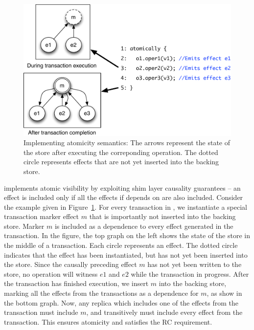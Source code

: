 \begin{figure}
\begin{center}
\includegraphics[width=\columnwidth]{Figures/AtomicityImpl}
\end{center}
\caption{Implementing atomicity semantics: The arrows represent the state of
the store after executing the correponding operation. The dotted circle
represents effects that are not yet inserted into the backing store.}
\label{fig:atomicity_impl}
\end{figure}

\name implements atomic visibility by exploiting shim layer causality guarantees
-- an effect is included only if all the effects if depends on are also
included. Consider the example given in Figure~\ref{fig:atomicity_impl}. For
every transaction in \name, we instantiate a special transaction marker effect
$m$ that is importantly not inserted into the backing store. Marker $m$ is
included as a dependence to every effect generated in the transaction. In the
figure, the top graph on the left shows the state of the store in the middle of
a transaction. Each circle represents an effect. The dotted circle indicates
that the effect has been instantiated, but has not yet been inserted into the
store. Since the causally preceding effect $m$ has not yet been written to the
store, no operation will witness $e1$ and $e2$ while the transaction in
progress. After the transaction has finished execution, we insert $m$ into the
backing store, marking all the effects from the transactions as a dependence
for $m$, as show in the bottom graph. Now, any replica which includes one of
the effects from the transaction must include $m$, and transitively must
include every effect from the transaction. This ensures atomicity and satisfies
the RC requirement.

